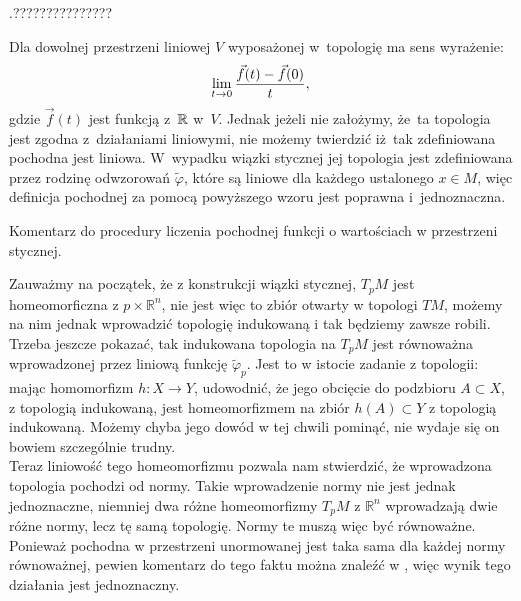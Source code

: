 \documentclass[a4paper,11pt]{article}
\begin{document}
\vspace{\spaceFour}


\start {} .???????????????

\vspace{\spaceFour}


\start {} Dla dowolnej przestrzeni liniowej $V$ wyposażonej
w~topologię ma sens wyrażenie:
\begin{equation*}
  \lim\limits_{ t \to 0 } \frac{ \vec{ f }( t ) - \vec{ f }( 0 ) }{ t },
\end{equation*}
gdzie $\vec{ f }( t )$ jest funkcją z~$\mathbb{R}$ w~$V$. Jednak jeżeli
nie założymy, że~ta topologia jest zgodna z~działaniami liniowymi, nie
możemy twierdzić iż~tak zdefiniowana pochodna jest liniowa. W~wypadku
wiązki stycznej jej topologia jest zdefiniowana przez rodzinę
odwzorowań $\widetilde{ \varphi }$, które są liniowe dla każdego
ustalonego $x \in M$, więc definicja pochodnej za pomocą powyższego
wzoru jest poprawna i~jednoznaczna.

\vspace{\spaceFour}


\start Komentarz do procedury liczenia pochodnej funkcji o wartościach
w przestrzeni stycznej.

Zauważmy na początek, że z konstrukcji wiązki stycznej, $T_{ p }M$
jest homeomorficzna z $p \times \mathbb{R}^{ n }$, nie jest więc to
zbiór otwarty w topologi $TM$, możemy na nim jednak wprowadzić
topologię indukowaną i tak będziemy zawsze robili. Trzeba jeszcze
pokazać, tak indukowana topologia na $T_{ p }M$ jest równoważna
wprowadzonej przez liniową funkcję $\widetilde{ \varphi }_{ p }$. Jest
to w istocie zadanie z topologii: mając homomorfizm $h : X \to Y$,
udowodnić,
że jego obcięcie do podzbioru $A \subset X$, z topologią indukowaną, jest homeomorfizmem na zbiór $h( A ) \subset Y$ z topologią indukowaną. Możemy chyba jego dowód w tej chwili pominąć, nie wydaje się on bowiem szczególnie trudny. \\
Teraz liniowość tego homeomorfizmu pozwala nam stwierdzić, że
wprowadzona topologia pochodzi od normy. Takie wprowadzenie normy nie
jest jednak jednoznaczne, niemniej dwa różne homeomorfizmy $T_{ p }M$
z $\mathbb{R}^{ n }$ wprowadzają dwie różne normy, lecz tę samą
topologię. Normy te muszą więc być równoważne. Ponieważ pochodna w
przestrzeni unormowanej jest taka sama dla każdej normy równoważnej,
pewien komentarz do tego faktu można znaleźć w \cite{Sch79}, więc
wynik tego działania jest jednoznaczny.
\end{document}
